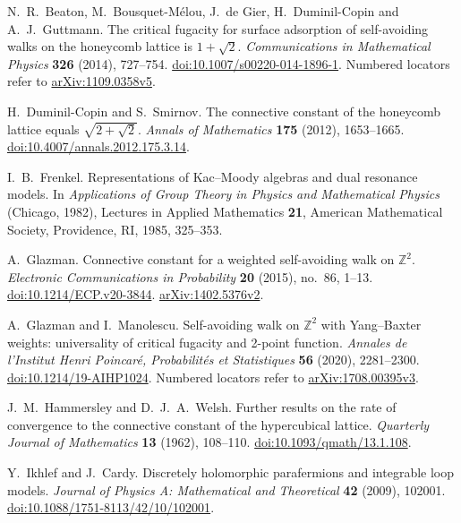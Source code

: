 N.~R.~Beaton, M.~Bousquet-M\'elou, J.~de Gier, H.~Duminil-Copin and A.~J.~Guttmann.
The critical fugacity for surface adsorption of self-avoiding walks on the
honeycomb lattice is $1+\sqrt2$.
\emph{Communications in Mathematical Physics} \textbf{326} (2014), 727--754.
\href{https://doi.org/10.1007/s00220-014-1896-1}{doi:10.1007/s00220-014-1896-1}.
Numbered locators refer to \href{https://arxiv.org/abs/1109.0358v5}{arXiv:1109.0358v5}.

H.~Duminil-Copin and S.~Smirnov.
The connective constant of the honeycomb lattice equals $\sqrt{2+\sqrt2}$.
\emph{Annals of Mathematics} \textbf{175} (2012), 1653--1665.
\href{https://doi.org/10.4007/annals.2012.175.3.14}{doi:10.4007/annals.2012.175.3.14}.

I.~B.~Frenkel.
Representations of Kac--Moody algebras and dual resonance models.
In \emph{Applications of Group Theory in Physics and Mathematical Physics}
(Chicago, 1982), Lectures in Applied Mathematics \textbf{21}, American
Mathematical Society, Providence, RI, 1985, 325--353.

A.~Glazman.
Connective constant for a weighted self-avoiding walk on $\mathbb Z^2$.
\emph{Electronic Communications in Probability} \textbf{20} (2015), no.~86, 1--13.
\href{https://doi.org/10.1214/ECP.v20-3844}{doi:10.1214/ECP.v20-3844}.
\href{https://arxiv.org/abs/1402.5376v2}{arXiv:1402.5376v2}.

A.~Glazman and I.~Manolescu.
Self-avoiding walk on $\mathbb Z^2$ with Yang--Baxter weights:
universality of critical fugacity and 2-point function.
\emph{Annales de l'Institut Henri Poincar\'e, Probabilit\'es et Statistiques}
\textbf{56} (2020), 2281--2300.
\href{https://doi.org/10.1214/19-AIHP1024}{doi:10.1214/19-AIHP1024}.
Numbered locators refer to \href{https://arxiv.org/abs/1708.00395v3}{arXiv:1708.00395v3}.

J.~M.~Hammersley and D.~J.~A.~Welsh.
Further results on the rate of convergence to the connective constant of
the hypercubical lattice.
\emph{Quarterly Journal of Mathematics} \textbf{13} (1962), 108--110.
\href{https://doi.org/10.1093/qmath/13.1.108}{doi:10.1093/qmath/13.1.108}.

Y.~Ikhlef and J.~Cardy.
Discretely holomorphic parafermions and integrable loop models.
\emph{Journal of Physics A: Mathematical and Theoretical} \textbf{42}
(2009), 102001.
\href{https://doi.org/10.1088/1751-8113/42/10/102001}{doi:10.1088/1751-8113/42/10/102001}.

